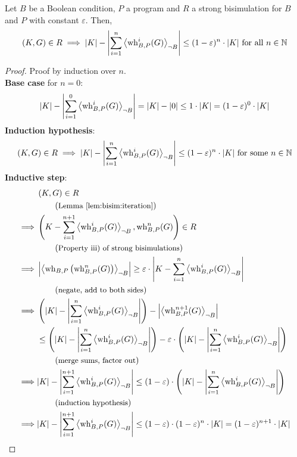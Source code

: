 \begin{lemma}[label=lem:bisim:iterateeps]
	Let $B$ be a Boolean condition, $P$ a program and $R$ a strong bisimulation for $B$ and $P$ with constant $\varepsilon$.
	Then,
	\[ \pair{K, G} \in R \implies \l| K \r| - \l| \sum_{i=1}^{n} \resN{\wh^i(G)} \r|
		\leq (1-\varepsilon)^n \cdot |K| \text{ for all } n \in \N \]
	\begin{proof}
		Proof by induction over $n$. \\
		\textbf{Base case} for $n = 0$:
		\[ |K| - \l| \sum_{i=1}^{0} \resN{\wh^i(G)} \r|
			= |K| - |0| \leq 1 \cdot |K| = (1-\varepsilon)^0 \cdot |K| \]
		\textbf{Induction hypothesis}:
		\[ \pair{K, G} \in R \implies \l| K \r| - \l| \sum_{i=1}^{n} \resN{\wh^i(G)} \r|
			\leq (1-\varepsilon)^n \cdot |K| \text{ for some } n \in \N \]
		\textbf{Inductive step}:	%
		\begin{align*}
		 & \pair{K, G} \in R \\
		 & \explain{Lemma~\ref{lem:bisim:iteration}} \\
		\implies & \pair{K - \sum_{i=1}^{n+1} \resN{\wh^i(G)}, \wh^n(G)} \in R \\
		 & \explain{Property iii) of strong bisimulations} \\
		\implies & \l| \resN{ \wh\l( \wh^n(G) \r) } \r|
			 \geq \varepsilon \cdot \l| K - \sum_{i=1}^{n} \resN{\wh^i(G)} \r| \\
		 & \explain{negate, add to both sides} \\
		\implies & \l( |K| - \l| \sum_{i=1}^{n} \resN{\wh^i(G)} \r| \r)
			- \l| \resN{ \wh^{n+1}(G) } \r| \\
		 & \leq  \l( |K| - \l| \sum_{i=1}^{n} \resN{\wh^i(G)} \r| \r)
			- \varepsilon \cdot
			\l( |K| - \l| \sum_{i=1}^{n} \resN{\wh^i(G)} \r| \r) \\
		 & \explain{merge sums, factor out} \\
		\implies & |K| - \l| \sum_{i=1}^{n+1} \resN{\wh^i(G)} \r|
			\leq (1-\varepsilon) \cdot 
			\l( |K| - \l| \sum_{i=1}^{n} \resN{\wh^i(G)} \r| \r) \\
		 & \explain{induction hypothesis} \\
		\implies & |K| - \l| \sum_{i=1}^{n+1} \resN{\wh^i(G)} \r|
			\leq (1-\varepsilon) \cdot (1-\varepsilon)^n \cdot |K|
			= (1-\varepsilon)^{n+1} \cdot |K| \\
		\end{align*}
	\end{proof}
\end{lemma}


